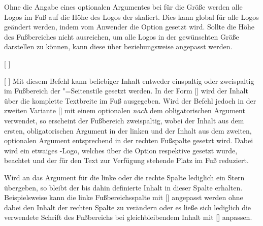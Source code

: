 \begin{Declaration*}{}
\begin{Declaration*}{}
\begin{Declaration*}{}
\begin{Declaration}[v2.05]{}%
\printdeclarationlist%
%
Ohne die Angabe eines optionalen Argumentes bei  für die Größe 
werden alle Logos im Fuß auf die Höhe des Logos der \TnUD skaliert. Dies kann 
global für alle Logos geändert werden, indem vom Anwender die Option 
 gesetzt wird. Sollte die Höhe des 
Fußbereiches nicht ausreichen, um alle Logos in der gewünschten Größe 
darstellen zu können, kann diese über  
beziehungsweise  angepasst werden.
\end{Declaration}

\begin{Declaration}{%
  [%
  ]%
}
\begin{Declaration}[v2.04]{%
  [%
  ]%
}
\printdeclarationlist%
%
%
Mit diesem Befehl kann beliebiger Inhalt entweder einspaltig oder zweispaltig 
im Fußbereich der "=Seitenstile gesetzt werden. In der 
Form [] wird der Inhalt über die komplette 
Textbreite im Fuß ausgegeben. Wird der Befehl jedoch in der zweiten Variante 
[] mit 
einem optionalen \emph{nach} dem obligatorischen Argument verwendet, so 
erscheint der Fußbereich zweispaltig, wobei der Inhalt aus dem ersten, 
obligatorischen Argument in der linken und der Inhalt aus dem zweiten, 
optionalen Argument entsprechend in der rechten Fußspalte gesetzt wird. Dabei 
wird ein etwaiges \DDC-Logo, welches über die Option  respektive
 gesetzt wurde, beachtet und der für den Text zur Verfügung 
stehende Platz im Fuß reduziert.

Wird an das Argument für die linke oder die rechte Spalte lediglich ein Stern 
\PValue{*} übergeben, so bleibt der bis dahin definierte Inhalt in dieser 
Spalte erhalten. Beispielsweise kann die linke Fußbereichsspalte mit 
[\POParameter{*}] angepasst werden ohne 
dabei den Inhalt der rechten Spalte zu verändern oder es ließe sich lediglich 
die verwendete Schrift des Fußbereichs bei gleichbleibendem Inhalt mit 
[\PParameter{*}\POParameter{*}]%
anpassen.


\end{Declaration}
\end{Declaration}
\end{Declaration*}
\end{Declaration*}
\end{Declaration*}
